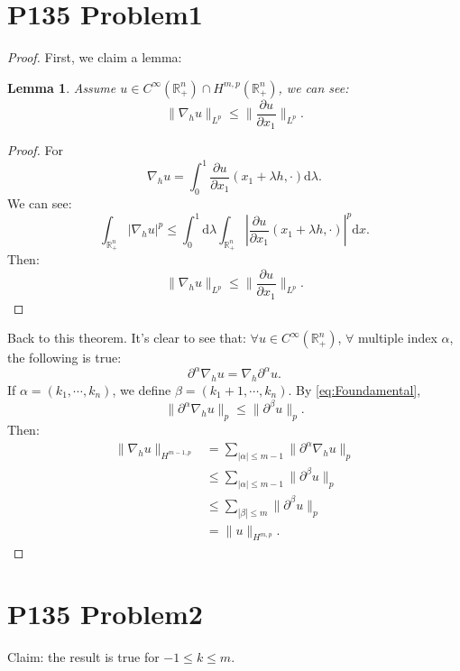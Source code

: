 \documentclass[a4paper]{ctexart}
\newtheorem{Lem}{\hspace{2em}Lemma}
\newcommand{\dif}{\mathrm{d}}
\newcommand{\pdfFrac}[2]{\frac{\partial #1}{\partial #2}}
\begin{document}
\section*{P135 Problem1}
\begin{proof}
    First, we claim a lemma:
    \begin{Lem}
        Assume $u\in C^{\infty}(\mathbb{R}_{+}^{n})\cap H^{m,p}(\mathbb{R}_{+}^{n})$, we can see:
        \begin{equation}
            \label{eq:Foundamental}
            \|\nabla_{h}u\|_{L^{p}}\le\|\pdfFrac{u}{x_{1}}\|_{L^{p}}.
        \end{equation}
    \end{Lem}
    \begin{proof}
        For
        \begin{equation}
            \label{eq:nablah}
            \nabla_{h}u=\int_{0}^{1}\pdfFrac{u}{x_{1}}(x_{1}+\lambda h,\cdot)\dif\lambda.
        \end{equation}
        We can see:
        \begin{equation}
            \int_{\mathbb{R}_{+}^{n}}|\nabla_{h}u|^{p}\le\int_{0}^{1}\dif\lambda\int_{\mathbb{R}_{+}^{n}}|\pdfFrac{u}{x_{1}}(x_{1}+\lambda h,\cdot)|^{p}\dif x.
        \end{equation}
        Then:
        \begin{equation}
            \|\nabla_{h}u\|_{L^{p}}\le\|\pdfFrac{u}{x_{1}}\|_{L^{p}}.
        \end{equation}
    \end{proof}
    Back to this theorem. It's clear to see that: $\forall$$u\in C^{\infty}(\mathbb{R}_{+}^{n})$, $\forall$ multiple index $\alpha$, the following is true:
    \begin{equation}
        \partial^{\alpha}\nabla_{h}u=\nabla_{h}\partial^{\alpha}u.
    \end{equation} 
    If $\alpha=(k_{1},\cdots,k_{n})$, we define $\beta=(k_{1}+1,\cdots,k_{n})$. By \eqref{eq:Foundamental}, 
    \begin{equation}
        \|\partial^{\alpha}\nabla_{h}u\|_{p}\le\|\partial^{\beta}u\|_{p}.
    \end{equation}
    Then:
    \begin{equation}
        \begin{aligned}
        \|\nabla_{h}u\|_{H^{m-1,p}}&=\sum_{|\alpha|\le m-1}\|\partial^{\alpha}\nabla_{h}u\|_{p}\\
        &\le\sum_{|\alpha|\le m-1}\|\partial^{\beta}u\|_{p}\\
        &\le\sum_{|\beta|\le m}\|\partial^{\beta}u\|_{p}\\
        &=\|u\|_{H^{m,p}}.
        \end{aligned}
    \end{equation}
\end{proof}
\section*{P135 Problem2}
Claim: the result is true for $-1\le k\le m$.
\end{document}
